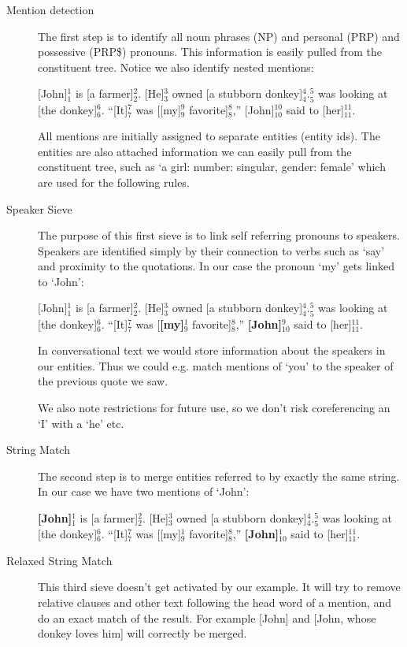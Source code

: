 \documentclass[12pt]{article}
\begin{document}
\begin{description}
\item[Mention detection]
The first step is to identify all noun phrases (NP) and personal (PRP) and possessive (PRP\$) pronouns. This information is easily pulled from the constituent tree. Notice we also identify nested mentions:

[John]$_1^1$ is [a farmer]$_2^2$. [He]$_3^3$ owned [a stubborn donkey]$_4^4$.\newline
[A girl]$_5^5$ was looking at [the donkey]$_6^6$.\newline
``[It]$_7^7$ was [[my]$_9^9$ favorite]$_8^8$,'' [John]$_{10}^{10}$ said to [her]$_{11}^{11}$.

All mentions are initially assigned to separate entities (entity ids). The entities are also attached information we can easily pull from the constituent tree, such as `a girl: {number: singular, gender: female}' which are used for the following rules.
\item[Speaker Sieve]
The purpose of this first sieve is to link self referring pronouns to speakers. Speakers are identified simply by their connection to verbs such as `say' and proximity to the quotations. In our case the pronoun `my' gets linked to `John':

[John]$_1^1$ is [a farmer]$_2^2$. [He]$_3^3$ owned [a stubborn donkey]$_4^4$.\newline
[A girl]$_5^5$ was looking at [the donkey]$_6^6$.\newline
``[It]$_7^7$ was [\textbf{[my]$_9^1$} favorite]$_8^8$,'' \textbf{[John]$_{10}^{9}$} said to [her]$_{11}^{11}$.

In conversational text we would store information about the speakers in our entities. Thus we could e.g. match mentions of `you' to the speaker of the previous quote we saw.

We also note restrictions for future use, so we don't risk coreferencing an `I' with a `he' etc.
\item[String Match]
The second step is to merge entities referred to by exactly the same string. In our case we have two mentions of `John':

\textbf{[John]$_1^1$} is [a farmer]$_2^2$. [He]$_3^3$ owned [a stubborn donkey]$_4^4$.\newline
[A girl]$_5^5$ was looking at [the donkey]$_6^6$.\newline
``[It]$_7^7$ was [[my]$_9^1$ favorite]$_8^8$,'' \textbf{[John]$_{10}^{1}$} said to [her]$_{11}^{11}$.
\item[Relaxed String Match]
This third sieve doesn't get activated by our example. It will try to remove relative clauses and other text following the head word of a mention, and do an exact match of the result. For example [John] and [John, whose donkey loves him] will correctly be merged.


\end{description}
\end{document}
